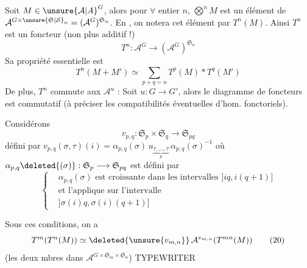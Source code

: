 
Soit $M\in{\unsure{\mathcal A|A}}^G$, alors pour $\forall$ entier $n$, $\bigotimes^n M$ est un
élément de $\mathcal A^{G\times\unsure{\mathfrak S|\mathcal S}_n}=(\mathcal A^G)^{\mathfrak S_n}$. En  ,
on notera cet élément par $T^n(M)$. Ainsi $T^n$ est
un foncteur (non plus additif !)
\[
T^n:\mathcal A^G\longrightarrow(\mathcal A^G)^{\mathfrak S_n} \tag*{(15)}
\]
Sa propriété essentielle est
\[
\boxed{T^n(M+M')\simeq\sum_{p+q=n}T^p(M)*T^q(M')} \tag*{(16)}
\]
De plus, $T^n$ commute aux $\mathcal A^u$ : Soit $u:G\longrightarrow G'$,
alors le diagramme de foncteurs
est commutatif (à préciser les compatibilités
 éventuelles d'hom. fonctoriels).

Considérons
\[
v_{p,q}:\mathfrak S_p\times\mathfrak S_q\longrightarrow\mathfrak S_{pq} \tag*{(18)}
\]
défini par $v_{p,q}(\sigma,\tau)(i)=\alpha_{p,q}(\sigma)\,u_{\underbrace{\tau,\ldots,\tau}_{p}}\,\alpha_{p,q}(\sigma)^{-1}$
où $\alpha_{p,q}\deleted{(\sigma)}:\mathfrak S_p\longrightarrow\mathfrak S_{pq}$ est défini par
\[
\left\{\begin{aligned}
&\alpha_{p,q}(\sigma)\text{ est croissante dans les intervalles } ]iq,i(q+1)]\\
&\text{et l'applique sur l'intervalle}\\
&]\sigma(i)q,\sigma(i)(q+1)]
\end{aligned}\right. \tag*{(19)}
\]

Sous ces conditions, on a
\[
T^m(T^n(M))\simeq\deleted{\unsure{v_{m,n}}}\,\mathcal A^{v_{m,n}}(T^{mn}(M)) \tag*{(20)}
\]
(les deux mbres dans $\mathcal A^{G\times\mathfrak S_m\times\mathfrak S_n}$)
  TYPEWRITER  
